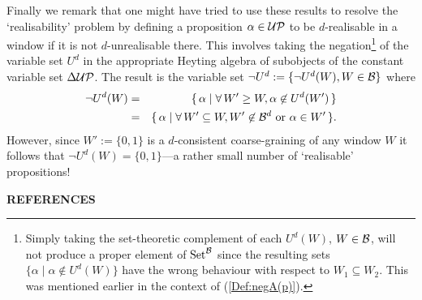 \documentclass[12pt]{article}
\newcounter{def-number}[section]
\newcommand{\beqa}{\begin{eqnarray}}
\newcommand{\eeqa}{\end{eqnarray}}
\newcommand{\oor}{\mbox{ or }}
\newcommand{\eq}[1]{(\ref{#1})}
\renewcommand{\a}{\alpha}                   %
\newcommand{\B}{{\cal B}}
\newcommand{\Bd}{{\cal B}^d}
\newcommand{\UP}{{\cal UP}}
\newcommand{\Set}{{\rm Set}}
\newcommand{\SetB}{{\Set^{\cal B}}}
\begin{document}
	Finally we remark that one might have tried to use these
results to resolve the `realisability' problem by defining a
proposition $\a\in\UP$ to be $d$-realisable in a window if it is
not $d$-unrealisable there. This involves taking the
negation\footnote{Simply taking the set-theoretic complement of
each $U^d(W)$, $W\in\B$, will not produce a proper element of
$\SetB$ since the resulting sets $\{\a\mid\a\not\in U^d(W)\}$
have the wrong behaviour with respect to $W_1\subseteq W_2$. This
was mentioned earlier in the context of \eq{Def:negA(p)}.} of
the variable set $U^d$ in the appropriate Heyting algebra of
subobjects of the constant variable set $\Delta\UP$.  The result
is the variable set $\neg U^d:=\{\neg U^d(W),W\in\B\}$ where
\beqa
	\neg U^d(W)&=&\{\,\a\mid \forall\, 
				W'\geq W, \a\not\in U^d(W')\,\}		\nonumber\\
			&=&\{\,\a\mid\forall\,W'\subseteq W, 
				W'\not\in\Bd\oor\a\in W'\,\}.		\label{negId}
\eeqa
However, since $W':=\{0,1\}$ is a $d$-consistent coarse-graining of any
window $W$ it follows that $\neg U^d(W)=\{0,1\}$---a rather
small number of `realisable' propositions!

\bigskip\bigskip\noindent
{\bf REFERENCES}
\end{document}
